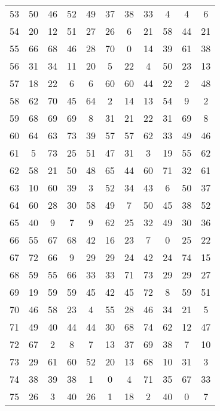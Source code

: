 \begin{table}
\begin{tabular}{c c c c c c c c c c c }
53 & 50 & 46 & 52 & 49 & 37 & 38 & 33 & 4 & 4 & 6 \\
54 & 20 & 12 & 51 & 27 & 26 & 6 & 21 & 58 & 44 & 21 \\
55 & 66 & 68 & 46 & 28 & 70 & 0 & 14 & 39 & 61 & 38 \\
56 & 31 & 34 & 11 & 20 & 5 & 22 & 4 & 50 & 23 & 13 \\
57 & 18 & 22 & 6 & 6 & 60 & 60 & 44 & 22 & 2 & 48 \\
58 & 62 & 70 & 45 & 64 & 2 & 14 & 13 & 54 & 9 & 2 \\
59 & 68 & 69 & 69 & 8 & 31 & 21 & 22 & 31 & 69 & 8 \\
60 & 64 & 63 & 73 & 39 & 57 & 57 & 62 & 33 & 49 & 46 \\
61 & 5 & 73 & 25 & 51 & 47 & 31 & 3 & 19 & 55 & 62 \\
62 & 58 & 21 & 50 & 48 & 65 & 44 & 60 & 71 & 32 & 61 \\
63 & 10 & 60 & 39 & 3 & 52 & 34 & 43 & 6 & 50 & 37 \\
64 & 60 & 28 & 30 & 58 & 49 & 7 & 50 & 45 & 38 & 52 \\
65 & 40 & 9 & 7 & 9 & 62 & 25 & 32 & 49 & 30 & 36 \\
66 & 55 & 67 & 68 & 42 & 16 & 23 & 7 & 0 & 25 & 22 \\
67 & 72 & 66 & 9 & 29 & 29 & 24 & 42 & 24 & 74 & 15 \\
68 & 59 & 55 & 66 & 33 & 33 & 71 & 73 & 29 & 29 & 27 \\
69 & 19 & 59 & 59 & 45 & 42 & 45 & 72 & 8 & 59 & 51 \\
70 & 46 & 58 & 23 & 4 & 55 & 28 & 46 & 34 & 21 & 5 \\
71 & 49 & 40 & 44 & 44 & 30 & 68 & 74 & 62 & 12 & 47 \\
72 & 67 & 2 & 8 & 7 & 13 & 37 & 69 & 38 & 7 & 10 \\
73 & 29 & 61 & 60 & 52 & 20 & 13 & 68 & 10 & 31 & 3 \\
74 & 38 & 39 & 38 & 1 & 0 & 4 & 71 & 35 & 67 & 33 \\
75 & 26 & 3 & 40 & 26 & 1 & 18 & 2 & 40 & 0 & 7 \\
\hline
\end{tabular}
\end{table}